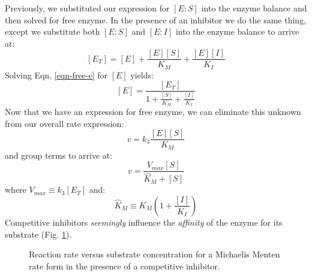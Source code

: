 \documentclass[11pt]{article}
\theoremstyle{definition}
\begin{document}
Previously, we substituted our expression for $\left[E:S\right]$ into the enzyme balance and then solved for free enzyme.
In the presence of an inhibitor we do the same thing, except we substitute both $\left[E:S\right]$ and $\left[E:I\right]$ into the enzyme balance to arrive at:
\begin{equation}\label{eqn-free-e}
	\left[E_{T}\right] = \left[E\right] + \frac{\left[E\right]\left[S\right]}{K_{M}}+\frac{\left[E\right]\left[I\right]}{K_{I}}
\end{equation}Solving Eqn. \eqref{eqn-free-e} for $\left[E\right]$ yields:
\begin{equation}\label{eqn-free-w-i}
	\left[E\right] = \frac{\left[E_{T}\right]}{1+\frac{\left[S\right]}{K_{M}}+\frac{\left[I\right]}{K_{I}}}
\end{equation}
Now that we have an expression for free enzyme, we can eliminate this unknown from our overall rate expression:
\begin{equation}\label{eqn:final-v}
	v = k_{3}\frac{\left[E\right]\left[S\right]}{K_{M}}
\end{equation}and group terms to arrive at:
\begin{equation}
	v = \frac{V_{max}\left[S\right]}{\hat{K}_{M}+\left[S\right]}
\end{equation}where $V_{max}\equiv{k_{3}}\left[E_{T}\right]$ and:
\begin{equation}
	\hat{K}_{M} \equiv K_{M}\left(1+\frac{\left[I\right]}{K_{I}}\right)
\end{equation}
Competitive inhibitors \emph{seemingly} influence the \emph{affinity} of the enzyme for its substrate (Fig. \ref{fig-mm-plot-ci}).
\begin{figure}[!h]\centering
{}
\caption{Reaction rate versus substrate concentration for a Michaelis Menten rate form in the presence of a competitive inhibitor.}\label{fig-mm-plot-ci}
\end{figure}
\end{document}
